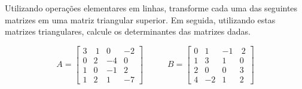 \begin{problem}
Utilizando operações elementares em linhas, transforme cada uma das seguintes matrizes em uma matriz triangular superior. Em seguida, utilizando estas matrizes triangulares, calcule os determinantes das matrizes dadas.

$$A = \left[ \begin{array}{rrrr}
 3 & \ 1 &  0 &  -2 \\
 0 &   2 & -4 &   0 \\
 1 &   0 & -1 &   2 \\  
 1 &   2 &  1 &  -7
\end{array} \right] \ \ \ \ \ \ \ \ \ \ \ \ \ B = \left[ \begin{array}{rrrr}
 0 &  1 & -1 &  \ 2 \\
 1 &  3 &  1 &  0 \\
 2 &  0 &  0 &  3 \\  
 4 & -2 &  1 &  2
\end{array} \right]$$
\end{problem}
